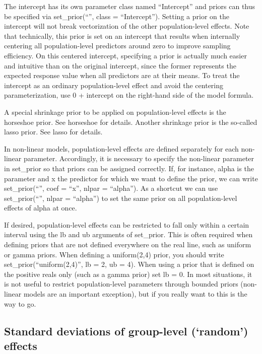 \documentclass[]{book}
\begin{document}
The intercept has its own parameter class named ``Intercept'' and priors can thus be specified via set\_prior(``'', class = ``Intercept''). Setting a prior on the intercept will not break vectorization of the other population-level effects. Note that technically, this prior is set on an intercept that results when internally centering all population-level predictors around zero to improve sampling efficiency. On this centered intercept, specifying a prior is actually much easier and intuitive than on the original intercept, since the former represents the expected response value when all predictors are at their means. To treat the intercept as an ordinary population-level effect and avoid the centering parameterization, use 0 + intercept on the right-hand side of the model formula.

A special shrinkage prior to be applied on population-level effects is the horseshoe prior. See horseshoe for details. Another shrinkage prior is the so-called lasso prior. See lasso for details.

In non-linear models, population-level effects are defined separately for each non-linear parameter. Accordingly, it is necessary to specify the non-linear parameter in set\_prior so that priors can be assigned correctly. If, for instance, alpha is the parameter and x the predictor for which we want to define the prior, we can write set\_prior(``'', coef = ``x'', nlpar = ``alpha''). As a shortcut we can use set\_prior(``'', nlpar = ``alpha'') to set the same prior on all population-level effects of alpha at once.

If desired, population-level effects can be restricted to fall only within a certain interval using the lb and ub arguments of set\_prior. This is often required when defining priors that are not defined everywhere on the real line, such as uniform or gamma priors. When defining a uniform(2,4) prior, you should write set\_prior(``uniform(2,4)'', lb = 2, ub = 4). When using a prior that is defined on the positive reals only (such as a gamma prior) set lb = 0. In most situations, it is not useful to restrict population-level parameters through bounded priors (non-linear models are an important exception), but if you really want to this is the way to go.

\hypertarget{standard-deviations-of-group-level-random-effects}{%
\subsection{Standard deviations of group-level (`random') effects}\label{standard-deviations-of-group-level-random-effects}}
\end{document}
